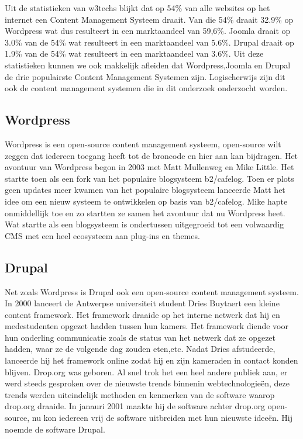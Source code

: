Uit de statistieken van w3techs blijkt dat op 54\% van alle websites op het internet een Content Management Systeem draait.  Van die 54\% draait 32.9\% op Wordpress wat dus resulteert in een marktaandeel van 59,6\%. Joomla draait op 3.0\% van de 54\% wat resulteert in een marktaandeel van 5.6\%. Drupal draait op 1.9\% van de 54\% wat resulteert in een marktaandeel van 3.6\%. Uit deze statistieken kunnen we ook makkelijk afleiden dat Wordpress,Joomla en Drupal de drie populairste Content Management Systemen zijn. Logischerwijs zijn dit ook de content management systemen die in dit onderzoek onderzocht worden. \autocite{w3techs2018}


\subsection{Wordpress}
Wordpress is een open-source content management systeem, open-source wilt zeggen dat iedereen toegang heeft tot de broncode en hier aan kan bijdragen. Het avontuur van Wordpress begon in 2003 met Matt Mullenweg en Mike Little. Het startte toen als een fork van het populaire blogsysteem b2/cafelog. Toen er plots geen updates meer kwamen van het populaire blogsysteem lanceerde Matt het idee om een nieuw systeem te ontwikkelen op basis van b2/cafelog. Mike hapte onmiddellijk toe en zo startten ze samen het avontuur dat nu Wordpress heet. Wat startte als een blogsysteem is ondertussen uitgegroeid tot een volwaardig CMS met een heel ecosysteem aan plug-ins en themes.\autocite{Postma2018}

\subsection{Drupal}
Net zoals Wordpress is Drupal ook een open-source content management systeem. In 2000 lanceert de Antwerpse universiteit student Dries Buytaert een kleine content framework. Het framework draaide op het interne netwerk dat hij en medestudenten opgezet hadden tussen hun kamers. Het framework diende voor hun onderling communicatie zoals de status van het netwerk dat ze opgezet hadden, waar ze de volgende dag zouden eten,etc. Nadat Dries afstudeerde, lanceerde hij het framework online zodat hij en zijn kameraden in contact konden blijven. Drop.org was geboren. Al snel trok het een heel andere publiek aan, er werd steeds gesproken over de nieuwste trends binnenin webtechnologieën, deze trends werden uiteindelijk methoden en kenmerken van de software waarop drop.org draaide. In janauri 2001 maakte hij de software achter drop.org open-source, nu kon iedereen vrij de software uitbreiden met hun nieuwste ideeën. Hij noemde de software Drupal.\autocite{Drupal2018}

